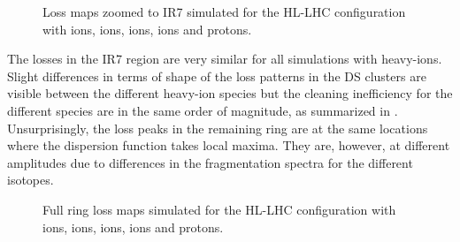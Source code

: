 \begin{figure}[t]
  \centering
  \caption{Loss maps zoomed to IR7 simulated for the HL-LHC configuration with \lead ions,  ions,  ions,  ions and protons.   }
  \label{pic:16072601}
  \end{figure}

The losses in the IR7 region are very similar for all simulations with heavy-ions. Slight differences in terms of shape of the loss patterns in the DS clusters are visible between the different heavy-ion species but the cleaning inefficiency for the different species are in the same order of magnitude, as summarized in . Unsurprisingly, the loss peaks in the remaining ring are at the same locations where the dispersion function takes local maxima. They are, however, at different amplitudes due to differences in the fragmentation spectra for the different isotopes. 



\begin{figure}[t]
  \centering
  \caption{Full ring loss maps simulated for the HL-LHC configuration with \lead ions,  ions,  ions,  ions and protons.}  
  \label{pic:16072602}
  \end{figure}


